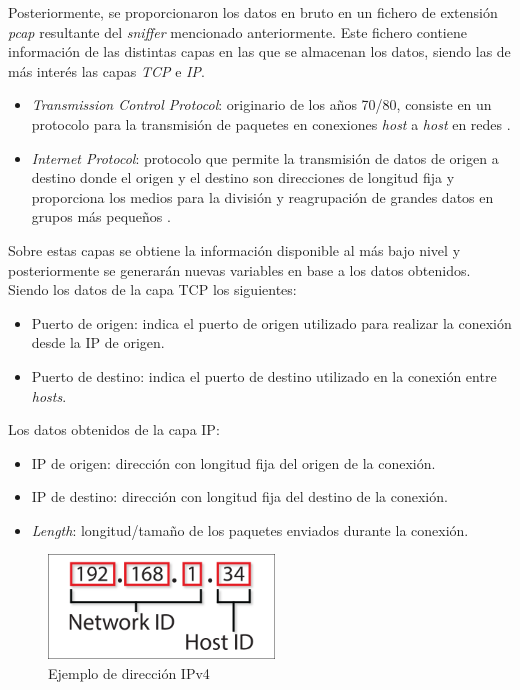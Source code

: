 Posteriormente, se proporcionaron los datos en bruto en un fichero de extensión \textit{pcap} resultante del \textit{sniffer} mencionado anteriormente. Este fichero contiene información de las distintas capas en las que se almacenan los datos, siendo las de más interés las capas \textit{TCP} e \textit{IP}.

\begin{itemize}
    \item \textit{Transmission Control Protocol}: originario de los años 70/80, consiste en un protocolo para la transmisión de paquetes en conexiones \textit{host} a \textit{host} en redes \cite{postel1981transmission}.
    \item \textit{Internet Protocol}: protocolo que permite la transmisión de datos de origen a destino donde el origen y el destino son direcciones de longitud fija y proporciona los medios para la división y reagrupación de grandes datos en grupos más pequeños \cite{postel1981internet} .
\end{itemize}

Sobre estas capas se obtiene la información disponible al más bajo nivel y posteriormente se generarán nuevas variables en base a los datos obtenidos. Siendo los datos de la capa TCP los siguientes:

\begin{itemize}
    \item Puerto de origen: indica el puerto de origen utilizado para realizar la conexión desde la IP de origen.
    \item Puerto de destino: indica el puerto de destino utilizado en la conexión entre \textit{hosts}.
\end{itemize}
\newpage

Los datos obtenidos de la capa IP:
\begin{itemize}
    \item IP de origen: dirección con longitud fija del origen de la conexión.
    \item IP de destino: dirección con longitud fija del destino de la conexión.
    \item \textit{Length}: longitud/tamaño de los paquetes enviados durante la conexión.
\end{itemize}

\begin{figure}[H]
    \centering
    \includegraphics[width=6cm]{figs/ip.png}
    \caption{Ejemplo de dirección IPv4}
    \label{fig:wireshark}
\end{figure}

